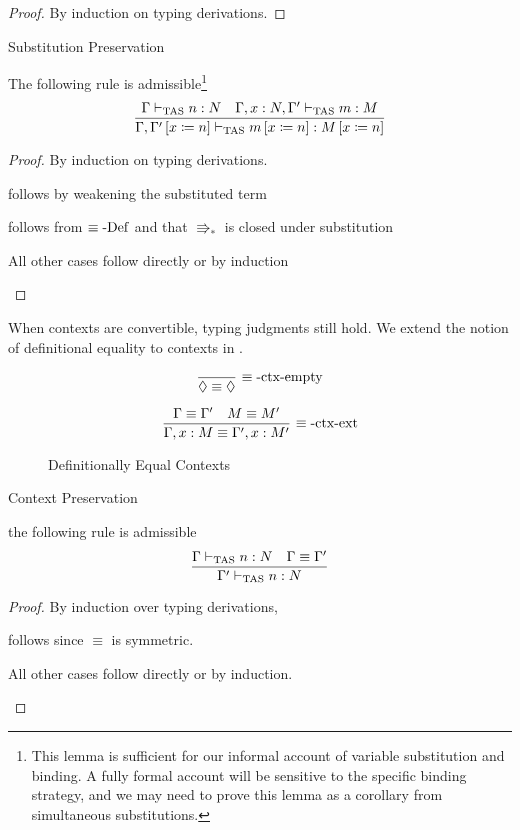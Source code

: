 \begin{proof}
By induction on typing derivations.
\end{proof}
\begin{lem}
Substitution Preservation
 
The following rule is admissible\footnote{
 This lemma is sufficient for our informal account of variable substitution and binding.
 A fully formal account will be sensitive to the specific binding strategy, and we may need to prove this lemma as a corollary from simultaneous substitutions.
}
\[
\frac{\Gamma\vdash_{\mathrm{TAS}} n:N\quad\Gamma,x:N,\Gamma'\vdash_{\mathrm{TAS}} m:M}{\Gamma,\Gamma'\left[x\coloneqq n\right]\vdash_{\mathrm{TAS}} m\left[x\coloneqq n\right]:M\left[x\coloneqq n\right]}
\]
\end{lem}
 
\begin{proof}
By induction on typing derivations.
 
\begin{casenv}
 \item {} follows by weakening the substituted term
 \item {} follows from $\equiv\operatorname{-Def}$ and that $\Rrightarrow_{\ast}$ is closed under substitution
 \item All other cases follow directly or by induction
\end{casenv}
\end{proof}
When contexts are convertible, typing judgments still hold.
We extend the notion of definitional equality to contexts in .
 
\begin{figure}
\[
\frac{\ }{\lozenge\equiv\lozenge}\,\rulename{\equiv-ctx-empty}
\]
 
\[
\frac{\Gamma\equiv\Gamma'\quad M\equiv M'}{\Gamma,x:M\equiv\Gamma',x:M'}\,\operatorname{\equiv-ctx-ext}
\]
 
\caption{Definitionally Equal Contexts}
\label{fig:surface-Context-Equiv}
\end{figure}
 
\begin{lem}
Context Preservation
 
the following rule is admissible
\[
\frac{\Gamma\vdash_{\mathrm{TAS}} n:N\quad\Gamma\equiv\Gamma'}{\Gamma'\vdash_{\mathrm{TAS}} n:N}
\]
\end{lem}
 
\begin{proof}
By induction over typing derivations,
 
\begin{casenv}
 \item {} follows since $\equiv$ is symmetric.
 \item All other cases follow directly or by induction.
\end{casenv}
\end{proof}
 
